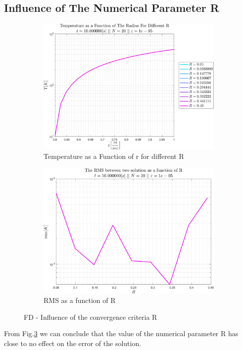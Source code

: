 \documentclass[11pt, a4paper]{article}
\begin{document}
\subsection{Influence of The Numerical Parameter R}
\begin{figure}[H]
    \centering
    \begin{subfigure}[c]{0.49\textwidth}
        \centering
        \includegraphics[width=\textwidth]{images/Influenc of R.png}
        \caption{Temperature as a Function of r for different R}
        \label{fig: T vs r for diff R}
    \end{subfigure}
    \hfill
    \begin{subfigure}[c]{0.49\textwidth}
        \centering
        \includegraphics[width=\textwidth]{images/Influenc of R - error.png}
        \caption{RMS as a function of R}
        \label{fig: RMS vs R}
    \end{subfigure}
    \caption{FD - Influence of the convergence criteria R}
    \label{fig: Influence of R}
\end{figure}
From Fig.\ref{fig: Influence of R} we can conclude that the value of the numerical parameter R has close to no effect on the error of the solution.
\end{document}
